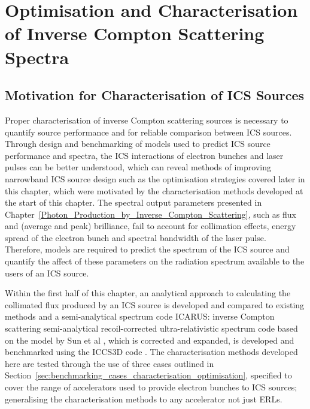 \documentclass[../main.tex]{subfiles}
\begin{document}
\chapter{Optimisation and Characterisation of Inverse Compton Scattering Spectra}
\label{Optimisation_and_Characterisation_of_Inverse_Compton Scattering_Spectra} %

\section{Motivation for Characterisation of ICS Sources}

Proper characterisation of inverse Compton scattering sources is necessary to quantify source performance and for reliable comparison between ICS sources. Through design and benchmarking of models used to predict ICS source performance and spectra, the ICS interactions of electron bunches and laser pulses can be better understood, which can reveal methods of improving narrowband ICS source design such as the optimisation strategies covered later in this chapter, which were motivated by the characterisation methods developed at the start of this chapter. The spectral output parameters presented in Chapter~\ref{Photon_Production_by_Inverse_Compton_Scattering}, such as flux and (average and peak) brilliance, fail to account for collimation effects, energy spread of the electron bunch and spectral bandwidth of the laser pulse. Therefore, models are required to predict the spectrum of the ICS source and quantify the affect of these parameters on the radiation spectrum available to the users of an ICS source. 

Within the first half of this chapter, an analytical approach to calculating the collimated flux produced by an ICS source is developed and compared to existing methods \cite{curatolo2017analytical} and a semi-analytical spectrum code \textsc{ICARUS}: inverse Compton scattering semi-analytical recoil-corrected ultra-relativistic spectrum code based on the model by Sun et al \cite{sun2009characterizations,sun2011theoretical}, which is corrected and expanded, is developed and benchmarked using the \textsc{ICCS3D} code \cite{krafft2016laser,ranjan2018simulation}. The characterisation methods developed here are tested through the use of three cases outlined in Section~\ref{sec:benchmarking_cases_characterisation_optimisation}, specified to cover the range of accelerators used to provide electron bunches to ICS sources; generalising the characterisation methods to any accelerator not just ERLs.
\end{document}
